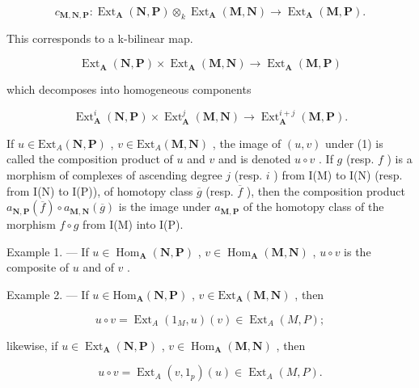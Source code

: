 \[
c _ {\mathbf {M}, \mathbf {N}, \mathbf {P}}: \operatorname{Ext} _ {\mathbf {A}} (\mathbf {N}, \mathbf {P}) \otimes_ {k} \operatorname{Ext} _ {\mathbf {A}} (\mathbf {M}, \mathbf {N}) \rightarrow \operatorname{Ext} _ {\mathbf {A}} (\mathbf {M}, \mathbf {P}).
\]

This corresponds to a k-bilinear map.

\[
\operatorname{Ext} _ {\mathbf {A}} (\mathbf {N}, \mathbf {P}) \times \operatorname{Ext} _ {\mathbf {A}} (\mathbf {M}, \mathbf {N}) \rightarrow \operatorname{Ext} _ {\mathbf {A}} (\mathbf {M}, \mathbf {P})\tag{1}
\]

which decomposes into homogeneous components

\[
\operatorname{Ext} _ {\mathbf {A}} ^ {i} (\mathbf {N}, \mathbf {P}) \times \operatorname{Ext} _ {\mathbf {A}} ^ {j} (\mathbf {M}, \mathbf {N}) \rightarrow \operatorname{Ext} _ {\mathbf {A}} ^ {i + j} (\mathbf {M}, \mathbf {P}).\tag{2}
\]

If \(u \in \text{Ext}_A(\mathbf{N}, \mathbf{P})\) , \(v \in \text{Ext}_A(\mathbf{M}, \mathbf{N})\) , the image of \((u, v)\) under (1) is called the composition product of \(u\) and \(v\) and is denoted \(u \circ v\) . If \(g\) (resp. \(f\) ) is a morphism of complexes of ascending degree \(j\) (resp. \(i\) ) from I(M) to I(N) (resp. from I(N) to I(P)), of homotopy class \(\overline{g}\) (resp. \(\overline{f}\) ), then the composition product \(a_{\mathbf{N},\mathbf{P}}(\overline{f}) \circ a_{\mathbf{M},\mathbf{N}}(\overline{g})\) is the image under \(a_{\mathbf{M},\mathbf{P}}\) of the homotopy class of the morphism \(f \circ g\) from I(M) into I(P).

Example 1. --- If \(u \in \operatorname{Hom}_{\mathbf{A}}(\mathbf{N}, \mathbf{P})\) , \(v \in \operatorname{Hom}_{\mathbf{A}}(\mathbf{M}, \mathbf{N})\) , \(u \circ v\) is the composite of \(u\) and of \(v\) .

Example 2. --- If \(u \in \mathrm{Hom}_{\mathbf{A}}(\mathbf{N}, \mathbf{P})\) , \(v \in \mathrm{Ext}_{\mathbf{A}}(\mathbf{M}, \mathbf{N})\) , then

\[
u \circ v = \operatorname{Ext} _ {A} (1 _ {M}, u) (v) \in \operatorname{Ext} _ {A} (M, P);
\]

likewise, if \(u \in \operatorname{Ext}_{\mathbf{A}}(\mathbf{N}, \mathbf{P})\) , \(v \in \operatorname{Hom}_{\mathbf{A}}(\mathbf{M}, \mathbf{N})\) , then

\[
u \circ v = \operatorname{Ext} _ {A} (v, 1 _ {p}) (u) \in \operatorname{Ext} _ {A} (M, P).
\]

